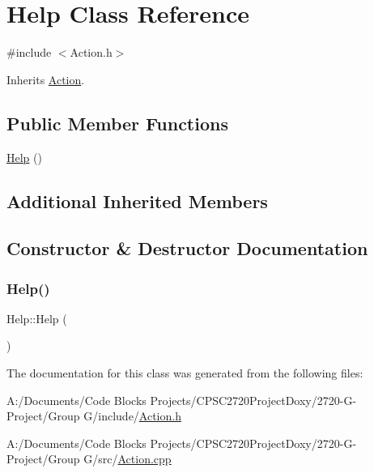 \hypertarget{class_help}{}\section{Help Class Reference}
\label{class_help}


{\ttfamily \#include $<$Action.\+h$>$}



Inherits \mbox{\hyperlink{class_action}{Action}}.

\subsection*{Public Member Functions}
\begin{DoxyCompactItemize}
\item 
\mbox{\hyperlink{class_help_aecdaeb53ac4c7dfef41c9bd8c341a928}{Help}} ()
\end{DoxyCompactItemize}
\subsection*{Additional Inherited Members}


\subsection{Constructor \& Destructor Documentation}
\mbox{\label{class_help_aecdaeb53ac4c7dfef41c9bd8c341a928}} 
\subsubsection{\texorpdfstring{Help()}{Help()}}
{\footnotesize\ttfamily Help\+::\+Help (\begin{DoxyParamCaption}{ }\end{DoxyParamCaption})}



The documentation for this class was generated from the following files\+:\begin{DoxyCompactItemize}
\item 
A\+:/\+Documents/\+Code Blocks Projects/\+C\+P\+S\+C2720\+Project\+Doxy/2720-\/\+G-\/\+Project/\+Group G/include/\mbox{\hyperlink{_action_8h}{Action.\+h}}\item 
A\+:/\+Documents/\+Code Blocks Projects/\+C\+P\+S\+C2720\+Project\+Doxy/2720-\/\+G-\/\+Project/\+Group G/src/\mbox{\hyperlink{_action_8cpp}{Action.\+cpp}}\end{DoxyCompactItemize}
